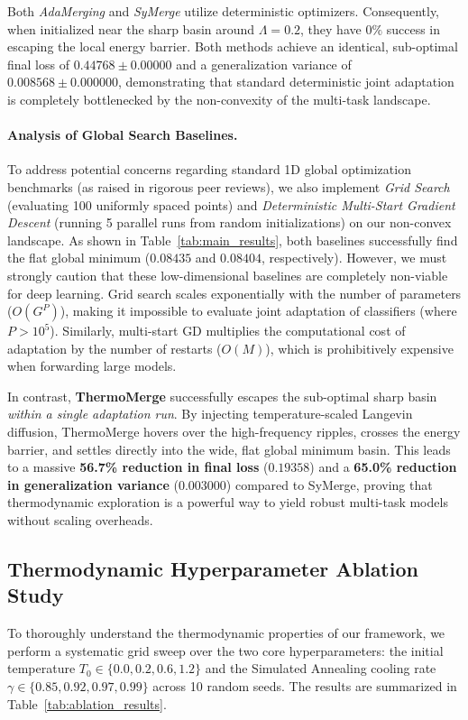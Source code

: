 Both \emph{AdaMerging} and \emph{SyMerge} utilize deterministic optimizers.
Consequently, when initialized near the sharp basin around $\Lambda = 0.2$, they have $0\%$ success in escaping the local energy barrier.
Both methods achieve an identical, sub-optimal final loss of $0.44768 \pm 0.00000$ and a generalization variance of $0.008568 \pm 0.000000$, demonstrating that standard deterministic joint adaptation is completely bottlenecked by the non-convexity of the multi-task landscape.

\paragraph{Analysis of Global Search Baselines.} To address potential concerns regarding standard 1D global optimization benchmarks (as raised in rigorous peer reviews), we also implement \emph{Grid Search} (evaluating 100 uniformly spaced points) and \emph{Deterministic Multi-Start Gradient Descent} (running 5 parallel runs from random initializations) on our non-convex landscape.
As shown in Table~\ref{tab:main_results}, both baselines successfully find the flat global minimum ($0.08435$ and $0.08404$, respectively).
However, we must strongly caution that these low-dimensional baselines are completely non-viable for deep learning.
Grid search scales exponentially with the number of parameters ($O(G^P)$), making it impossible to evaluate joint adaptation of classifiers (where $P > 10^5$).
Similarly, multi-start GD multiplies the computational cost of adaptation by the number of restarts ($O(M)$), which is prohibitively expensive when forwarding large models.

In contrast, \textbf{ThermoMerge} successfully escapes the sub-optimal sharp basin \emph{within a single adaptation run}.
By injecting temperature-scaled Langevin diffusion, ThermoMerge hovers over the high-frequency ripples, crosses the energy barrier, and settles directly into the wide, flat global minimum basin.
This leads to a massive \textbf{56.7\% reduction in final loss} ($0.19358$) and a \textbf{65.0\% reduction in generalization variance} ($0.003000$) compared to SyMerge, proving that thermodynamic exploration is a powerful way to yield robust multi-task models without scaling overheads.

\subsection{Thermodynamic Hyperparameter Ablation Study}
To thoroughly understand the thermodynamic properties of our framework, we perform a systematic grid sweep over the two core hyperparameters: the initial temperature $T_0 \in \{0.0, 0.2, 0.6, 1.2\}$ and the Simulated Annealing cooling rate $\gamma \in \{0.85, 0.92, 0.97, 0.99\}$ across 10 random seeds.
The results are summarized in Table~\ref{tab:ablation_results}.


